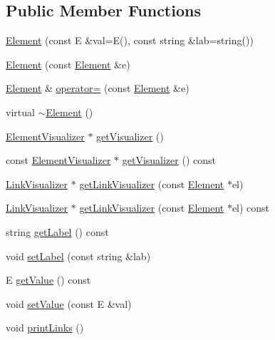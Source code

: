 \subsection*{Public Member Functions}
\begin{DoxyCompactItemize}
\item 
\hyperlink{classbridges_1_1_element_abc7131584142ea48faf3b7a8033d1fef}{Element} (const E \&val=E(), const string \&lab=string())
\item 
\hyperlink{classbridges_1_1_element_a6dc69b51f85f4e9914434b8c79126057}{Element} (const \hyperlink{classbridges_1_1_element}{Element} \&e)
\item 
\hyperlink{classbridges_1_1_element}{Element} \& \hyperlink{classbridges_1_1_element_a0f1b5a5688fe4db68f84969e93cea245}{operator=} (const \hyperlink{classbridges_1_1_element}{Element} \&e)
\item 
virtual \hyperlink{classbridges_1_1_element_a1dcdcd8948db683fc109687fe5d9c8e1}{$\sim$\+Element} ()
\item 
\hyperlink{classbridges_1_1_element_visualizer}{Element\+Visualizer} $\ast$ \hyperlink{classbridges_1_1_element_a358f350ae6e33d55c4ac9f9213d0c5bc}{get\+Visualizer} ()
\item 
const \hyperlink{classbridges_1_1_element_visualizer}{Element\+Visualizer} $\ast$ \hyperlink{classbridges_1_1_element_a7672ce8623ab561d457b4a91e19c4e53}{get\+Visualizer} () const 
\item 
\hyperlink{classbridges_1_1_link_visualizer}{Link\+Visualizer} $\ast$ \hyperlink{classbridges_1_1_element_aa8dd91d04c22c697f7c500a18642282f}{get\+Link\+Visualizer} (const \hyperlink{classbridges_1_1_element}{Element} $\ast$el)
\item 
\hyperlink{classbridges_1_1_link_visualizer}{Link\+Visualizer} $\ast$ \hyperlink{classbridges_1_1_element_a27567b3dd7ddce9217ca9958d1a03214}{get\+Link\+Visualizer} (const \hyperlink{classbridges_1_1_element}{Element} $\ast$el) const 
\item 
string \hyperlink{classbridges_1_1_element_aa5e02165249d5d55066132d3128cb6a8}{get\+Label} () const 
\item 
void \hyperlink{classbridges_1_1_element_a22313b74452175d07650168a701daa99}{set\+Label} (const string \&lab)
\item 
E \hyperlink{classbridges_1_1_element_a20290b80dca1c052d9fdb71abf4f0b5e}{get\+Value} () const 
\item 
void \hyperlink{classbridges_1_1_element_a737cb19281b6aa45a5a1dc9d592dad93}{set\+Value} (const E \&val)
\item 
void \hyperlink{classbridges_1_1_element_ae6f773c7222ff3a37c402e5e1f413c66}{print\+Links} ()
\end{DoxyCompactItemize}
